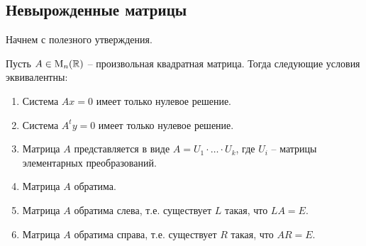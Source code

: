 \subsection{Невырожденные матрицы}

Начнем с полезного утверждения.

\begin{claim}
\label{claim::InvertibleDiscription}
Пусть $A\in\operatorname{M}_{n}(\mathbb R)$ -- произвольная квадратная матрица.
Тогда следующие условия эквивалентны:
\begin{enumerate}
\item Система $Ax = 0$ имеет только нулевое решение.

\item Система $A^ty = 0$ имеет только нулевое решение.

\item Матрица $A$ представляется в виде $A = U_1\cdot \ldots \cdot U_k$, где $U_i$ -- матрицы элементарных преобразований.

\item Матрица $A$ обратима.

\item Матрица $A$ обратима слева, т.е. существует $L$ такая, что $LA = E$.

\item Матрица $A$ обратима справа, т.е. существует $R$ такая, что $AR = E$.
\end{enumerate}
\end{claim}
